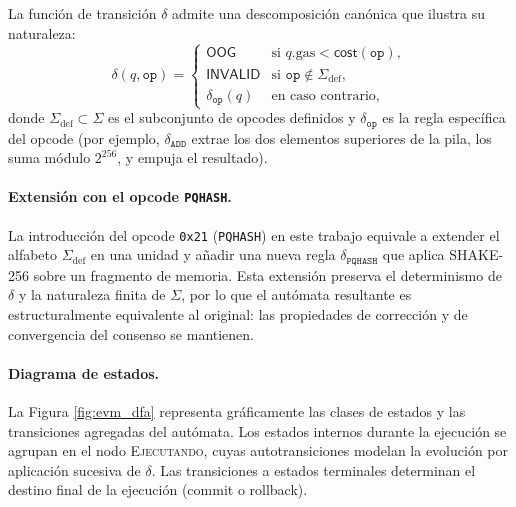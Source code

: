 La función de transición $\delta$ admite una descomposición canónica que ilustra su naturaleza:
\begin{equation}
  \delta(q, \texttt{op}) =
    \begin{cases}
      \textsf{OOG} & \text{si } q.\text{gas} < \textsf{cost}(\texttt{op}), \\
      \textsf{INVALID} & \text{si } \texttt{op} \notin \Sigma_{\text{def}}, \\
      \delta_{\texttt{op}}(q) & \text{en caso contrario},
    \end{cases}
  \label{eq:delta_evm}
\end{equation}
donde $\Sigma_{\text{def}} \subset \Sigma$ es el subconjunto de opcodes definidos y $\delta_{\texttt{op}}$ es la regla específica del opcode (por ejemplo, $\delta_{\texttt{ADD}}$ extrae los dos elementos superiores de la pila, los suma módulo $2^{256}$, y empuja el resultado).

\paragraph{Extensión con el opcode \texttt{PQHASH}.} La introducción del opcode \texttt{0x21} (\texttt{PQHASH}) en este trabajo equivale a extender el alfabeto $\Sigma_{\text{def}}$ en una unidad y añadir una nueva regla $\delta_{\texttt{PQHASH}}$ que aplica SHAKE-256 sobre un fragmento de memoria. Esta extensión preserva el determinismo de $\delta$ y la naturaleza finita de $\Sigma$, por lo que el autómata resultante es estructuralmente equivalente al original: las propiedades de corrección y de convergencia del consenso se mantienen.

\paragraph{Diagrama de estados.} La Figura \ref{fig:evm_dfa} representa gráficamente las clases de estados y las transiciones agregadas del autómata. Los estados internos durante la ejecución se agrupan en el nodo \textsc{Ejecutando}, cuyas autotransiciones modelan la evolución por aplicación sucesiva de $\delta$. Las transiciones a estados terminales determinan el destino final de la ejecución (commit o rollback).

